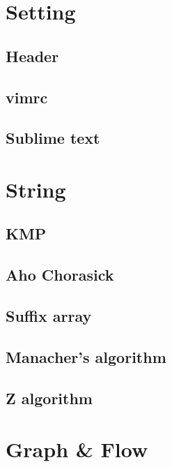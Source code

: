 \documentclass[10pt,landscape,a4paper,twocolumn]{article}
\begin{document}
\tableofcontents

\section{Setting}
\subsection{Header}


\subsection{vimrc}


\subsection{Sublime text}


\section{String}
\subsection{KMP}


\subsection{Aho Chorasick}


\subsection{Suffix array}


\subsection{Manacher's algorithm}


\subsection{Z algorithm}



\section{Graph \& Flow}
\end{document}
